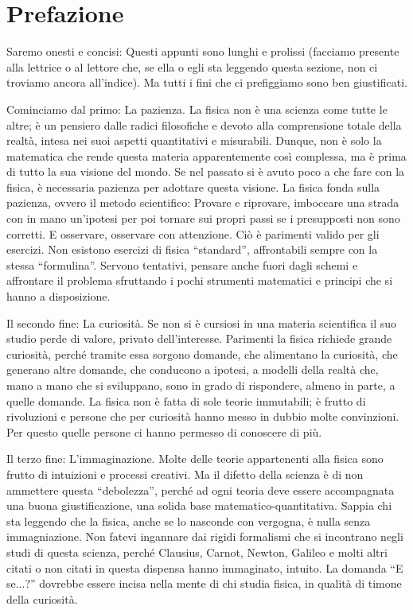 \section*{Prefazione}
Saremo onesti e concisi: Questi appunti sono lunghi e prolissi (facciamo presente
alla lettrice o al lettore che, se ella o egli sta leggendo questa sezione,
non ci troviamo ancora all'indice). Ma tutti i fini che ci prefiggiamo sono ben
giustificati.

Cominciamo dal primo: La pazienza. La fisica non è una scienza come tutte le altre;
è un pensiero dalle radici filosofiche e devoto alla comprensione totale della
realtà, intesa nei suoi aspetti quantitativi e misurabili. Dunque, non è solo la
matematica che rende questa materia apparentemente così complessa, ma è prima di
tutto la sua visione del mondo. Se nel passato si è avuto poco a che fare con la
fisica, è necessaria pazienza per adottare questa visione. La fisica fonda sulla
pazienza, ovvero il metodo scientifico: Provare e riprovare, imboccare una strada
con in mano un'ipotesi per poi tornare sui propri passi se i presupposti non sono
corretti. E osservare, osservare con attenzione. Ciò è parimenti valido per gli
esercizi. Non esistono esercizi di fisica ``standard'', affrontabili sempre con
la stessa ``formulina''. Servono tentativi, pensare anche fuori dagli schemi
e affrontare il problema sfruttando i pochi strumenti matematici e principi
che si hanno a disposizione.

Il secondo fine: La curiosità. Se non si è cursiosi in una materia scientifica
il suo studio perde di valore, privato dell'interesse. Parimenti la fisica richiede
grande curiosità, perché tramite essa sorgono domande, che alimentano la curiosità,
che generano altre domande, che conducono a ipotesi, a modelli della realtà che,
mano a mano che si sviluppano, sono in grado di rispondere, almeno in parte, a
quelle domande. La fisica non è fatta di sole teorie immutabili; è frutto di rivoluzioni
e persone che per curiosità hanno messo in dubbio molte convinzioni.
Per questo quelle persone ci hanno permesso di conoscere di più.

Il terzo fine: L'immaginazione. Molte delle teorie appartenenti alla fisica
sono frutto di intuizioni e processi creativi. Ma il difetto della scienza è
di non ammettere questa ``debolezza'', perché ad ogni teoria deve essere
accompagnata una buona giustificazione, una solida base matematico-quantitativa.
Sappia chi sta leggendo che la fisica, anche se lo nasconde con vergogna, è
nulla senza immagniazione. Non fatevi ingannare dai rigidi formalismi che si
incontrano negli studi di questa scienza, perché Clausius, Carnot, Newton,
Galileo e molti altri citati o non citati in questa dispensa hanno immaginato,
intuito. La domanda ``E se...?'' dovrebbe essere incisa nella mente
di chi studia fisica, in qualità di timone della curiosità.

